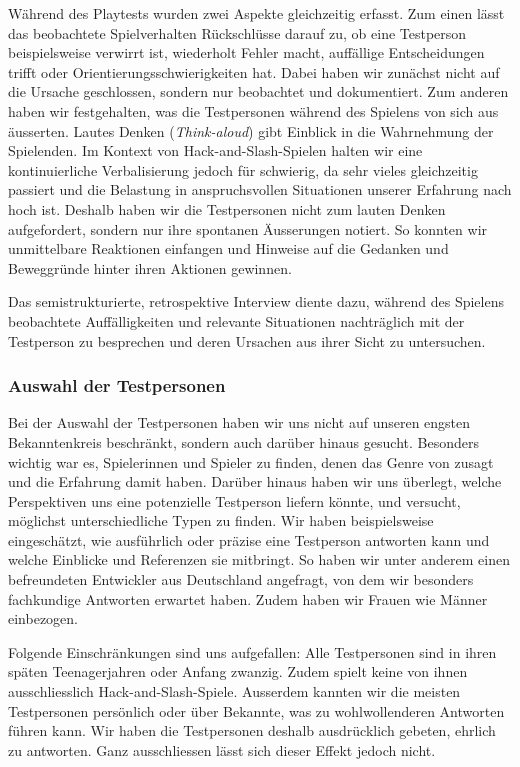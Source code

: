 \documentclass[../Main.tex]{subfiles}
\begin{document}
Während des Playtests wurden zwei Aspekte gleichzeitig erfasst. Zum einen lässt das beobachtete Spielverhalten Rückschlüsse darauf zu, ob eine Testperson beispielsweise verwirrt ist, wiederholt Fehler macht, auffällige Entscheidungen trifft oder Orientierungsschwierigkeiten hat. Dabei haben wir zunächst nicht auf die Ursache geschlossen, sondern nur beobachtet und dokumentiert. Zum anderen haben wir festgehalten, was die Testpersonen während des Spielens von sich aus äusserten. Lautes Denken (\textit{Think-aloud}) gibt Einblick in die Wahrnehmung der Spielenden.\autocite[189--190]{drachen2018gamesuserresearch} Im Kontext von Hack-and-Slash-Spielen halten wir eine kontinuierliche Verbalisierung jedoch für schwierig, da sehr vieles gleichzeitig passiert und die Belastung in anspruchsvollen Situationen unserer Erfahrung nach hoch ist. Deshalb haben wir die Testpersonen nicht zum lauten Denken aufgefordert, sondern nur ihre spontanen Äusserungen notiert. So konnten wir unmittelbare Reaktionen einfangen und Hinweise auf die Gedanken und Beweggründe hinter ihren Aktionen gewinnen.

Das semistrukturierte, retrospektive Interview diente dazu, während des Spielens beobachtete Auffälligkeiten und relevante Situationen nachträglich mit der Testperson zu besprechen und deren Ursachen aus ihrer Sicht zu untersuchen.\autocite[164--167]{drachen2018gamesuserresearch}

\subsubsection{Auswahl der Testpersonen} \label{sec:AuswahlTP}
Bei der Auswahl der Testpersonen haben wir uns nicht auf unseren engsten Bekanntenkreis beschränkt, sondern auch darüber hinaus gesucht. Besonders wichtig war es, Spielerinnen und Spieler zu finden, denen das Genre von  zusagt und die Erfahrung damit haben. Darüber hinaus haben wir uns überlegt, welche Perspektiven uns eine potenzielle Testperson liefern könnte, und versucht, möglichst unterschiedliche Typen zu finden. Wir haben beispielsweise eingeschätzt, wie ausführlich oder präzise eine Testperson antworten kann und welche Einblicke und Referenzen sie mitbringt. So haben wir unter anderem einen befreundeten Entwickler aus Deutschland angefragt, von dem wir besonders fachkundige Antworten erwartet haben. Zudem haben wir Frauen wie Männer einbezogen.

Folgende Einschränkungen sind uns aufgefallen: Alle Testpersonen sind in ihren späten Teenagerjahren oder Anfang zwanzig. Zudem spielt keine von ihnen ausschliesslich Hack-and-Slash-Spiele. Ausserdem kannten wir die meisten Testpersonen persönlich oder über Bekannte, was zu wohlwollenderen Antworten führen kann. Wir haben die Testpersonen deshalb ausdrücklich gebeten, ehrlich zu antworten. Ganz ausschliessen lässt sich dieser Effekt jedoch nicht.
\end{document}
